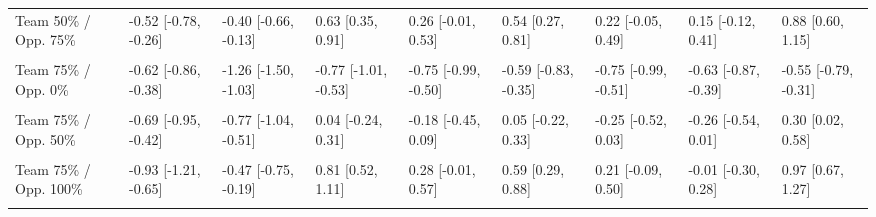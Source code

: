 \documentclass[]{elsarticle} %
\begin{document}
\begin{landscape}
\begin{table}
{\begin{tabular}[t]{lllllllll}
Team 50\% / Opp. 75\% & -0.52 [-0.78, -0.26] & -0.40 [-0.66, -0.13] & 0.63 [0.35, 0.91] & 0.26 [-0.01, 0.53] & 0.54 [0.27, 0.81] & 0.22 [-0.05, 0.49] & 0.15 [-0.12, 0.41] & 0.88 [0.60, 1.15]\\
\cellcolor{gray!6}{Team 50\% / Opp. 100\%} & \cellcolor{gray!6}{-0.65 [-0.93, -0.37]} & \cellcolor{gray!6}{-0.24 [-0.52, 0.03]} & \cellcolor{gray!6}{1.01 [0.72, 1.30]} & \cellcolor{gray!6}{0.51 [0.22, 0.79]} & \cellcolor{gray!6}{0.81 [0.52, 1.10]} & \cellcolor{gray!6}{0.42 [0.13, 0.71]} & \cellcolor{gray!6}{0.20 [-0.08, 0.48]} & \cellcolor{gray!6}{1.15 [0.86, 1.44]}\\
\addlinespace
Team 75\% / Opp. 0\% & -0.62 [-0.86, -0.38] & -1.26 [-1.50, -1.03] & -0.77 [-1.01, -0.53] & -0.75 [-0.99, -0.50] & -0.59 [-0.83, -0.35] & -0.75 [-0.99, -0.51] & -0.63 [-0.87, -0.39] & -0.55 [-0.79, -0.31]\\
\cellcolor{gray!6}{Team 75\% / Opp. 25\%} & \cellcolor{gray!6}{-0.66 [-0.92, -0.41]} & \cellcolor{gray!6}{-1.04 [-1.29, -0.79]} & \cellcolor{gray!6}{-0.34 [-0.60, -0.09]} & \cellcolor{gray!6}{-0.46 [-0.72, -0.21]} & \cellcolor{gray!6}{-0.27 [-0.52, -0.01]} & \cellcolor{gray!6}{-0.49 [-0.75, -0.23]} & \cellcolor{gray!6}{-0.46 [-0.71, -0.20]} & \cellcolor{gray!6}{-0.13 [-0.39, 0.13]}\\
Team 75\% / Opp. 50\% & -0.69 [-0.95, -0.42] & -0.77 [-1.04, -0.51] & 0.04 [-0.24, 0.31] & -0.18 [-0.45, 0.09] & 0.05 [-0.22, 0.33] & -0.25 [-0.52, 0.03] & -0.26 [-0.54, 0.01] & 0.30 [0.02, 0.58]\\
\cellcolor{gray!6}{Team 75\% / Opp. 75\%} & \cellcolor{gray!6}{-0.80 [-1.07, -0.53]} & \cellcolor{gray!6}{-0.63 [-0.90, -0.35]} & \cellcolor{gray!6}{0.43 [0.15, 0.72]} & \cellcolor{gray!6}{0.03 [-0.25, 0.31]} & \cellcolor{gray!6}{0.32 [0.04, 0.60]} & \cellcolor{gray!6}{0.01 [-0.27, 0.29]} & \cellcolor{gray!6}{-0.07 [-0.35, 0.21]} & \cellcolor{gray!6}{0.70 [0.41, 0.99]}\\
Team 75\% / Opp. 100\% & -0.93 [-1.21, -0.65] & -0.47 [-0.75, -0.19] & 0.81 [0.52, 1.11] & 0.28 [-0.01, 0.57] & 0.59 [0.29, 0.88] & 0.21 [-0.09, 0.50] & -0.01 [-0.30, 0.28] & 0.97 [0.67, 1.27]\\
\addlinespace
\cellcolor{gray!6}{Team 100\% / Opp. 0\%} & \cellcolor{gray!6}{-0.80 [-1.06, -0.53]} & \cellcolor{gray!6}{-1.41 [-1.67, -1.16]} & \cellcolor{gray!6}{-0.90 [-1.15, -0.64]} & \cellcolor{gray!6}{-0.91 [-1.16, -0.65]} & \cellcolor{gray!6}{-0.77 [-1.03, -0.51]} & \cellcolor{gray!6}{-0.96 [-1.21, -0.70]} & \cellcolor{gray!6}{-0.87 [-1.12, -0.61]} & \cellcolor{gray!6}{-0.77 [-1.02, -0.51]}\\

\end{tabular}}
\end{table}
\end{landscape}
\end{document}
